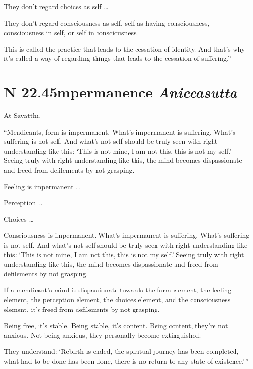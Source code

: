 \documentclass[12pt,openany]{book}%
\newcommand*{\suttatitleacronym}[1]{\smaller[2]{#1}\vspace*{.3em}}
\newcommand*{\suttatitletranslation}[1]{\linebreak{#1}}
\newcommand*{\suttatitleroot}[1]{\linebreak\smaller[2]\itshape{#1}}
\newcommand*{\tocacronym}[1]{\hspace*{-3.3em}{#1}\quad}
\newcommand*{\toctranslation}[1]{#1}
\newcommand*{\tocroot}[1]{(\textit{#1})}
\begin{document}
They don’t regard choices as self … 

They don’t regard consciousness as self, self as having consciousness, consciousness in self, or self in consciousness. 

This is called the practice that leads to the cessation of identity. And that’s why it’s called a way of regarding things that leads to the cessation of suffering.” 

%
\section*{{\suttatitleacronym SN 22.45}{\suttatitletranslation Impermanence }{\suttatitleroot Aniccasutta}}
\addcontentsline{toc}{section}{\tocacronym{SN 22.45} \toctranslation{Impermanence } \tocroot{Aniccasutta}}

At \textsanskrit{Sāvatthī}. 

“Mendicants, form is impermanent. What’s impermanent is suffering. What’s suffering is not-self. And what’s not-self should be truly seen with right understanding like this: ‘This is not mine, I am not this, this is not my self.’ Seeing truly with right understanding like this, the mind becomes dispassionate and freed from defilements by not grasping. 

Feeling is impermanent … 

Perception … 

Choices … 

Consciousness is impermanent. What’s impermanent is suffering. What’s suffering is not-self. And what’s not-self should be truly seen with right understanding like this: ‘This is not mine, I am not this, this is not my self.’ Seeing truly with right understanding like this, the mind becomes dispassionate and freed from defilements by not grasping. 

If a mendicant’s mind is dispassionate towards the form element, the feeling element, the perception element, the choices element, and the consciousness element, it’s freed from defilements by not grasping. 

Being free, it’s stable. Being stable, it’s content. Being content, they’re not anxious. Not being anxious, they personally become extinguished. 

They understand: ‘Rebirth is ended, the spiritual journey has been completed, what had to be done has been done, there is no return to any state of existence.’” 
\end{document}
